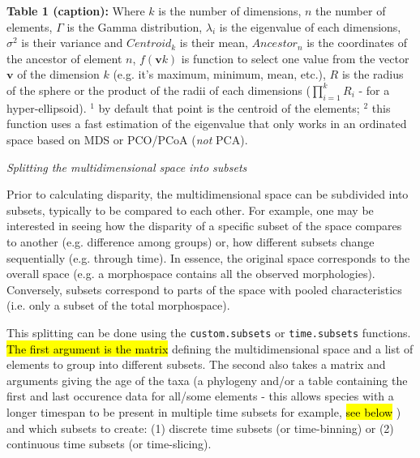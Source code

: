 \documentclass[12pt,letterpaper]{article}
\renewcommand{\subsection}[1]{%
\bigskip
\begin{center}
\begin{large}
\normalfont\itshape #1
\end{large}
\end{center}}
\begin{document}
\begin{table}
\end{table}

\textbf{Table 1 (caption):} Where $k$ is the number of dimensions, $n$ the number of elements, $\Gamma$ is the Gamma distribution, $\lambda_i$ is the eigenvalue of each dimensions, $\sigma^{2}$ is their variance and $Centroid_{k}$ is their mean, $Ancestor_{n}$ is the coordinates of the ancestor of element $n$, $f(\mathbf{v}k)$ is function to select one value from the vector $\mathbf{v}$ of the dimension $k$ (e.g. it's maximum, minimum, mean, etc.), $R$ is the radius of the sphere or the product of the radii of each dimensions ($\displaystyle\prod_{i=1}^{k}R_{i}$ - for a hyper-ellipsoid). $^1$ by default that point is the centroid of the elements; $^2$ this function uses a fast estimation of the eigenvalue that only works in an ordinated space based on MDS or PCO/PCoA (\textit{not} PCA).
\label{Tab:metrics}


\subsection{Splitting the multidimensional space into subsets}
Prior to calculating disparity, the multidimensional space can be subdivided into subsets, typically to be compared to each other.
For example, one may be interested in seeing how the disparity of a specific subset of the space compares to another (e.g. difference among groups) or, how different subsets change sequentially (e.g. through time).
In essence, the original space corresponds to the overall space (e.g. a morphospace contains all the observed morphologies).
Conversely, subsets correspond to parts of the space with pooled characteristics (i.e. only a subset of the total morphospace).

This splitting can be done using the \texttt{custom.subsets} or \texttt{time.subsets} functions.
\hl{The first argument is the matrix}
defining the multidimensional space and a list of elements to group into different subsets.
The second also takes a matrix and arguments giving the age of the taxa (a phylogeny and/or a table containing the first and last occurence data for all/some elements - this allows species with a longer timespan to be present in multiple time subsets for example, 
\hl{see below}
) and which subsets to create: (1) discrete time subsets (or time-binning) or (2) continuous time subsets (or time-slicing).
\end{document}
